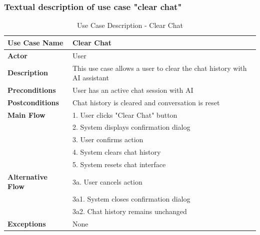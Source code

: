 \subsubsection{Textual description of use case "clear chat"}
\begin{table}[H]
\centering
\caption{Use Case Description - Clear Chat}
\begin{tabular}{|l|p{10cm}|}
\hline
\textbf{Use Case Name} & Clear Chat \\
\hline
\textbf{Actor} & User \\
\hline
\textbf{Description} & This use case allows a user to clear the chat history with AI assistant \\
\hline
\textbf{Preconditions} & User has an active chat session with AI \\
\hline
\textbf{Postconditions} & Chat history is cleared and conversation is reset \\
\hline
\textbf{Main Flow} & 1. User clicks "Clear Chat" button \\
& 2. System displays confirmation dialog \\
& 3. User confirms action \\
& 4. System clears chat history \\
& 5. System resets chat interface \\
\hline
\textbf{Alternative Flow} & 3a. User cancels action \\
& 3a1. System closes confirmation dialog \\
& 3a2. Chat history remains unchanged \\
\hline
\textbf{Exceptions} & None \\
\hline
\end{tabular}
\end{table}

